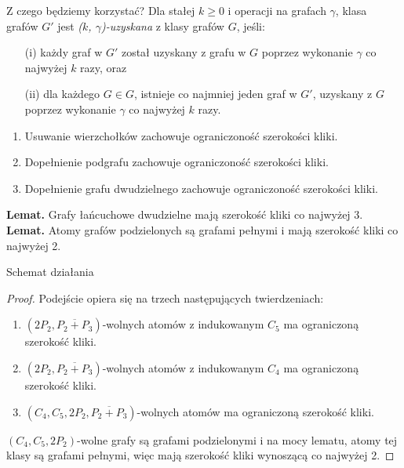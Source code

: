 \documentclass[polish]{beamer}
\begin{document}
\begin{frame}{Z czego będziemy korzystać?}
    Dla stałej $k \geq 0$ i operacji na grafach $\gamma$, klasa grafów $G'$ jest \emph{($k$, $\gamma$)-uzyskana} z klasy grafów $G$, jeśli:
    \begin{itemize}
        \item[(i)] każdy graf w $G'$ został uzyskany z grafu w $G$ poprzez wykonanie $\gamma$ co najwyżej $k$ razy, oraz
        \item[(ii)] dla każdego $G \in G$, istnieje co najmniej jeden graf w $G'$, uzyskany z $G$ poprzez wykonanie $\gamma$ co najwyżej $k$ razy.
    \end{itemize}
    \begin{enumerate}
        \item Usuwanie wierzchołków zachowuje ograniczoność szerokości kliki.
        \item Dopełnienie podgrafu zachowuje ograniczoność szerokości kliki.
        \item Dopełnienie grafu dwudzielnego zachowuje ograniczoność szerokości kliki.
    \end{enumerate}

    \textbf{Lemat.} Grafy łańcuchowe dwudzielne mają szerokość kliki co najwyżej 3.\\
    \textbf{Lemat.} Atomy grafów podzielonych są grafami pełnymi i mają szerokość kliki co najwyżej 2.
\end{frame}

\begin{frame}{Schemat działania}
    \begin{proof}
        \renewcommand{\qedsymbol}{}
        Podejście opiera się na trzech następujących twierdzeniach:
        \begin{enumerate}
            \item $(2P_2, \overline{P_2 + P_3})$-wolnych atomów z indukowanym $C_5$ ma ograniczoną szerokość kliki.
            \item $(2P_2, \overline{P_2 + P_3})$-wolnych atomów z indukowanym $C_4$ ma ograniczoną szerokość kliki.
            \item $(C_4, C_5, 2P_2, \overline{P_2 + P_3})$-wolnych atomów ma ograniczoną szerokość kliki.
        \end{enumerate}
        $(C_4, C_5, 2P_2)$-wolne grafy są grafami podzielonymi i na mocy lematu, atomy tej klasy są grafami pełnymi, więc mają szerokość kliki wynoszącą co najwyżej 2.    
    \end{proof}
\end{frame}
\end{document}
